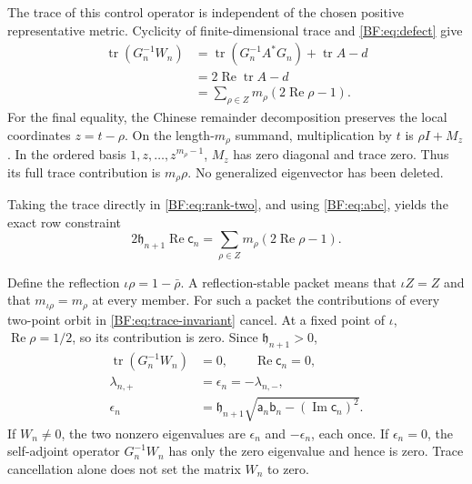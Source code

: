 The trace of this control operator is independent of the chosen
positive representative metric.  Cyclicity of finite-dimensional
trace and \eqref{BF:eq:defect} give
\begin{equation}
\begin{split}
\operatorname{tr}(G_n^{-1}W_n)
&=\operatorname{tr}(G_n^{-1}A^*G_n)
  +\operatorname{tr}A-d\\
&=2\operatorname{Re}\operatorname{tr}A-d\\
&=\sum_{\rho\in Z}m_\rho(2\operatorname{Re}\rho-1).
\end{split}
\tag{BF.23}\label{BF:eq:trace-invariant}
\end{equation}
For the final equality, the Chinese remainder decomposition preserves
the local coordinates \(z=t-\rho\).  On the length-\(m_\rho\)
summand, multiplication by \(t\) is \(\rho I+M_z\).  In the ordered
basis \(1,z,\ldots,z^{m_\rho-1}\), \(M_z\) has zero diagonal and
trace zero.  Thus its full trace contribution is \(m_\rho\rho\).
No generalized eigenvector has been deleted.

Taking the trace directly in \eqref{BF:eq:rank-two}, and using
\eqref{BF:eq:abc}, yields the exact row constraint
\begin{equation}
\boxed{\;
2\mathfrak h_{n+1}\operatorname{Re}\mathsf c_n
 =\sum_{\rho\in Z}m_\rho(2\operatorname{Re}\rho-1).
\;}
\tag{BF.24}\label{BF:eq:row-trace}
\end{equation}

Define the reflection \(\iota\rho=1-\bar\rho\).
A reflection-stable packet means that \(\iota Z=Z\) and that
\(m_{\iota\rho}=m_\rho\) at every member.
For such a packet the contributions of every two-point orbit in
\eqref{BF:eq:trace-invariant} cancel.  At a fixed point of \(\iota\),
\(\operatorname{Re}\rho=1/2\), so its contribution is zero.
Since \(\mathfrak h_{n+1}>0\),
\begin{equation}
\begin{split}
\operatorname{tr}(G_n^{-1}W_n)&=0,
\qquad\operatorname{Re}\mathsf c_n=0,\\
\lambda_{n,+}&=\epsilon_n=-\lambda_{n,-},\\
\epsilon_n
 &=\mathfrak h_{n+1}
   \sqrt{\mathsf a_n\mathsf b_n-
                 (\operatorname{Im}\mathsf c_n)^2}.
\end{split}
\tag{BF.25}\label{BF:eq:reflection-trace}
\end{equation}
If \(W_n\ne0\), the two nonzero eigenvalues are
\(\epsilon_n\) and \(-\epsilon_n\), each once.
If \(\epsilon_n=0\), the self-adjoint operator \(G_n^{-1}W_n\)
has only the zero eigenvalue and hence is zero.  Trace cancellation
alone does not set the matrix \(W_n\) to zero.

